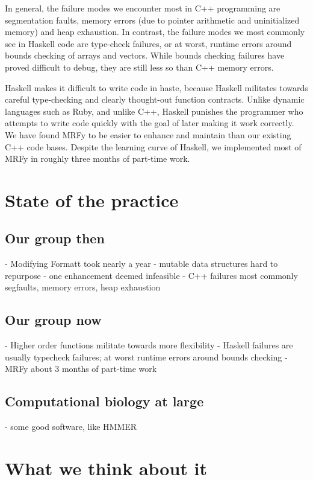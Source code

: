 \documentclass[preprint,nocopyrightspace,times]{sigplanconf}
\begin{document}
In general, the failure modes we encounter most in C++ programming are 
segmentation faults, memory errors (due to pointer arithmetic and uninitialized 
memory) and heap exhaustion. In contrast, the failure modes we most commonly 
see in Haskell code are type-check failures, or at worst, runtime errors around 
bounds checking of arrays and vectors. While bounds checking failures have 
proved difficult to debug, they are still less so than C++ memory errors.


Haskell makes it difficult to write code in haste, because Haskell militates 
towards careful type-checking and clearly thought-out function contracts. 
Unlike dynamic languages such as Ruby, and unlike C++, Haskell punishes the 
programmer who attempts to write code quickly with the goal of later making it 
work correctly. We have found MRFy to be easier to enhance and maintain than 
our existing C++ code bases. Despite the learning curve of Haskell, we 
implemented most of MRFy in roughly three months of part-time work.

 
\section{State of the practice}

\subsection{Our group then}
 - Modifying Formatt took nearly a year
 - mutable data structures hard to repurpose
 - one enhancement deemed infeasible
 - C++ failures most commonly segfaults, memory errors, heap exhaustion

\subsection{Our group now}
 - Higher order functions militate towards more flexibility
 - Haskell failures are usually typecheck failures; at worst runtime errors around bounds checking
 - MRFy about 3 months of part-time work

\subsection{Computational biology at large}
 - some good software, like HMMER

\section{What we think about it}
\end{document}
